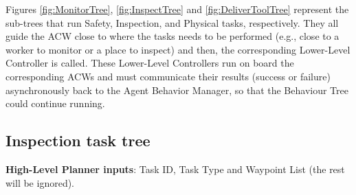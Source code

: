 
Figures \ref{fig:MonitorTree}, \ref{fig:InspectTree} and \ref{fig:DeliverToolTree} represent the sub-trees that run Safety, Inspection, and Physical tasks, respectively. They all guide the \gls{ACW} close to where the tasks needs to be performed (e.g., close to a worker to monitor or a place to inspect) and then, the corresponding Lower-Level Controller is called. These Lower-Level Controllers run on board the corresponding \gls{ACW}s and must communicate their results (success or failure) asynchronously back to the Agent Behavior Manager, so that the Behaviour Tree could continue running.


\subsection{Inspection task tree}
\label{sec:InspectionTaskTree}
\textbf{High-Level Planner inputs}: Task ID, Task Type and Waypoint List (the rest will be ignored).

